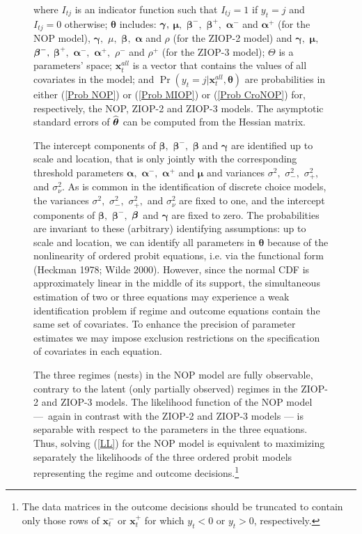 \documentclass[letterpaper,fleqn,12pt]{article}
\begin{document}
\begin{figure}[H]
\begin{onehalfspace}
\noindent where $I_{tj}$ is an indicator function such that $I_{tj}=1$ if $%
y_{t}=j$ and $I_{tj}=0$ otherwise; $\mathbf{\theta }$ includes: $\mathbf{%
\gamma ,}$ $\mathbf{\mu ,}$ $\mathbf{\beta }^{-},$ $\mathbf{\beta }^{+},$ $%
\mathbf{\alpha }^{-}$ and $\mathbf{\alpha }^{+}$ (for the NOP model), $%
\mathbf{\gamma },$ $\mu ,$ $\mathbf{\beta },$ $\mathbf{\alpha }$ and $\rho $
(for the ZIOP-2 model) and $\mathbf{\gamma },$ $\mathbf{\mu },$ $\mathbf{%
\beta }^{-},$ $\mathbf{\beta }^{+},$ $\mathbf{\alpha }^{-},$ $\mathbf{\alpha 
}^{+},$ $\rho ^{-}$ and $\rho ^{+}$ (for the ZIOP-3 model); $\Theta $ is a
parameters' space; $\mathbf{x}_{t}^{all}$ is a vector that contains the
values of all covariates in the model; and $\Pr (y_{t}=j|\mathbf{x}%
_{t}^{all},\mathbf{\theta })$ are probabilities in either (\ref{Prob NOP})
or (\ref{Prob MIOP}) or (\ref{Prob CroNOP}) for, respectively, the NOP,
ZIOP-2 and ZIOP-3 models. The asymptotic standard errors of $\widehat{%
\mathbf{\theta }}$ can be computed from the Hessian matrix.

The intercept components of $\mathbf{\beta ,}$ $\mathbf{\beta }^{-},$ $%
\mathbf{\beta }$ and $\mathbf{\gamma }$ are identified up to scale and
location, that is only jointly with the corresponding threshold parameters $%
\mathbf{\alpha ,}$ $\mathbf{\alpha }^{-}\mathbf{,}$ $\mathbf{\alpha }^{+}$
and $\mathbf{\mu }$ and variances $\sigma ^{2},$ $\sigma _{-}^{2},$ $\sigma
_{+}^{2},$ and $\sigma _{\nu }^{2}$. As is common in the identification of
discrete choice models, the variances $\sigma ^{2},$ $\sigma _{-}^{2},$ $%
\sigma _{+}^{2},$ and $\sigma _{\nu }^{2}$ are fixed to one, and the
intercept components of $\mathbf{\beta ,}$ $\mathbf{\beta }^{-},$ $\mathbf{%
\beta }$ and $\mathbf{\gamma }$ are fixed to zero. The probabilities are
invariant to these (arbitrary) identifying assumptions: up to scale and
location, we can identify all parameters in $\mathbf{\theta }$ because of
the nonlinearity of ordered probit equations, i.e. via the functional form
(Heckman 1978; Wilde 2000). However, since the normal CDF is approximately
linear in the middle of its support, the simultaneous estimation of two or
three equations may experience a weak identification problem if regime and
outcome equations contain the same set of covariates. To enhance the
precision of parameter estimates we may impose exclusion restrictions on the
specification of covariates in each equation.

The three regimes (nests) in the NOP model are fully observable, contrary to
the latent (only partially observed) regimes in the ZIOP-2 and ZIOP-3
models. The likelihood function of the NOP model ---\ again in contrast with
the ZIOP-2 and ZIOP-3 models --- is separable with respect to the parameters
in the three equations. Thus, solving (\ref{LL}) for the NOP model is
equivalent to maximizing separately the likelihoods of the three ordered
probit models representing the regime and outcome decisions.\footnote{%
The data matrices in the outcome decisions should be truncated to contain
only those rows of $\mathbf{x}_{t}^{-}$ or $\mathbf{x}_{t}^{+}$ for which $%
y_{t}<0$ or $y_{t}>0$, respectively.}


\end{onehalfspace}
\end{figure}
\end{document}
